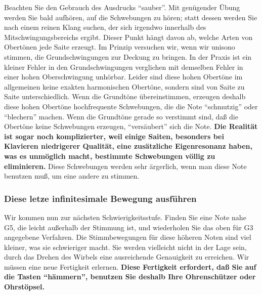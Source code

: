 Beachten Sie den Gebrauch des Ausdrucks \enquote{sauber}.
Mit genügender Übung werden Sie bald aufhören, auf die Schwebungen zu hören; statt dessen werden Sie nach einem reinen Klang suchen, der sich irgendwo innerhalb des Mitschwingungsbereichs ergibt.
Dieser Punkt hängt davon ab, welche Arten von Obertönen jede Saite erzeugt.
Im Prinzip versuchen wir, wenn wir unisono stimmen, die Grundschwingungen zur Deckung zu bringen.
In der Praxis ist ein kleiner Fehler in den Grundschwingungen verglichen mit demselben Fehler in einer hohen Oberschwingung unhörbar.
Leider sind diese hohen Obertöne im allgemeinen keine exakten harmonischen Obertöne, sondern sind von Saite zu Saite unterschiedlich.
Wenn die Grundtöne übereinstimmen, erzeugen deshalb diese hohen Obertöne hochfrequente Schwebungen, die die Note \enquote{schmutzig} oder \enquote{blechern} machen.
Wenn die Grundtöne gerade so verstimmt sind, daß die Obertöne keine Schwebungen erzeugen, \enquote{versäubert} sich die Note.
\textbf{Die Realität ist sogar noch komplizierter, weil einige Saiten, besonders bei Klavieren niedrigerer Qualität, eine zusätzliche Eigenresonanz haben, was es unmöglich macht, bestimmte Schwebungen völlig zu eliminieren.}
Diese Schwebungen werden sehr ärgerlich, wenn man diese Note benutzen muß, um eine andere zu stimmen.
 

\label{c2_5f}
\subsubsection{Diese letze infinitesimale Bewegung ausführen}
\label{c2_5_infi}

Wir kommen nun zur nächsten Schwierigkeitsstufe.
Finden Sie eine Note nahe G5, die leicht außerhalb der Stimmung ist, und wiederholen Sie das oben für G3 angegebene Verfahren.
Die Stimmbewegungen für diese höheren Noten sind viel kleiner, was sie schwieriger macht.
Sie werden vielleicht nicht in der Lage sein, durch das Drehen des Wirbels eine ausreichende Genauigkeit zu erreichen.
Wir müssen eine neue Fertigkeit erlernen.
\textbf{Diese Fertigkeit erfordert, daß Sie auf die Tasten \enquote{hämmern}, benutzen Sie deshalb Ihre Ohrenschützer oder Ohrstöpsel.}

